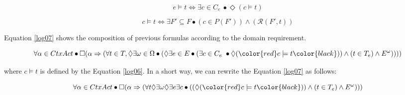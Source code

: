 \begin{equation}
    \label{log05}
       e \models t \Longleftrightarrow \exists c \in C_e \ \bullet \Diamond ( c \models t )
\end{equation}

\begin{equation}
    \label{log06}
       c \models t \Longleftrightarrow \exists F' \subseteq F \bullet (c \in P(F')) \land (\mathcal{R}(F', t))
\end{equation}

Equation \ref{log07} shows the composition of previous formulas according to the domain requirement.

\begin{equation}
    \label{log07}
       \forall \alpha \in CtxAct \bullet \square(\alpha \Rightarrow ( \forall t \in T, \Diamond \exists \omega \in \Omega \bullet (\Diamond \exists e \in E \bullet  (\exists c \in C_e \ \bullet \Diamond (\color{red} c \models t \color{black} ) ) \land (t \in T_e) \land E^\omega) ))) 
\end{equation}

where $c \models t$ is defined by the Equation \ref{log06}. In a short way, we can rewrite the Equation \ref{log07} as follows:
 
 \begin{equation}
    \label{log08}
       \forall \alpha \in CtxAct \bullet \square(\alpha \Rightarrow ( \forall t \Diamond \exists \omega \Diamond \exists e \exists c \bullet ( (\Diamond (\color{red} c \models t \color{black} ) ) \land (t \in T_e) \land E^\omega) )) 
\end{equation}